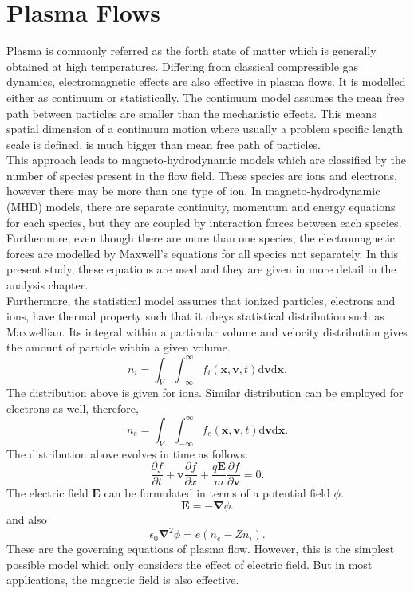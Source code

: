 \documentclass[12pt]{report}
\begin{document}
\section{Plasma Flows}
Plasma is commonly referred as the forth state of matter which is generally obtained at high temperatures\cite{IntPlasma}. Differing from classical compressible gas dynamics, electromagnetic effects are also effective in plasma flows. It is modelled either as continuum or statistically. The continuum model assumes the mean free path between particles are smaller than the mechanistic effects. This means spatial dimension of a continuum motion where usually a problem specific length scale is defined, is much bigger than mean free path of particles. 
\\
This approach leads to magneto-hydrodynamic models which are classified by the number of species present in the flow field\cite{IntPlasma}. These species are ions and  electrons, however there may be more than one type of ion. In magneto-hydrodynamic (MHD) models, there are separate continuity, momentum and energy equations for each species, but they are coupled by interaction forces between each species. Furthermore, even though there are more than one species, the electromagnetic forces are modelled by Maxwell's equations for all species not separately\cite{IntPlasma,Vasilevski}. In this present study, these equations are used and they are given in more detail in the analysis chapter.
\\
Furthermore, the statistical model assumes that ionized particles, electrons and ions, have thermal property such that it obeys statistical distribution such as Maxwellian. Its integral within a particular volume and velocity distribution gives the amount of particle within a given volume. 
\begin{equation}
	n_i=\int_V\int_{-\infty}^{\infty}f_i(\mathbf{x},\mathbf{v},t)\mathrm{d}\mathbf{v}\mathrm{d}\mathbf{x}.
\end{equation}
The distribution above is given for ions. Similar distribution can be employed for electrons as well, therefore,
\begin{equation}
n_e=\int_V\int_{-\infty}^{\infty}f_e(\mathbf{x},\mathbf{v},t)\mathrm{d}\mathbf{v}\mathrm{d}\mathbf{x}.
\end{equation}
The distribution above evolves in time as follows:
\begin{equation}
\frac{\partial f}{\partial t}+ \mathbf{v}\frac{\partial f}{\partial x}+\frac{q\mathbf{E}}{m}\frac{\partial f}{\partial \mathbf{v}}=0.
\end{equation}
The electric field $\mathbf{E}$ can be formulated in terms of a potential field $\phi$.
\begin{equation}
\mathbf{E}=-\mathbf{\nabla}\phi.
\end{equation}
and also 
\begin{equation}
\epsilon_0 \mathbf{\nabla}^2 \phi=e(n_e-Zn_i).
\end{equation}
These are the governing equations of plasma flow. However, this is the simplest possible model which only considers the effect of electric field. But in most applications, the magnetic field is also effective\cite{IntPlasma}.
\end{document}
